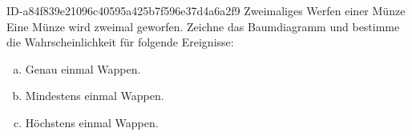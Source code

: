\begin{exercise}
      {ID-a84f839e21096c40595a425b7f596e37d4a6a2f9}
      {Zweimaliges Werfen einer Münze}
  \ifproblem\problem
    Eine Münze wird zweimal geworfen. Zeichne das Baumdiagramm und bestimme
    die Wahrscheinlichkeit für folgende Ereignisse:
    \begin{enumerate}[a)]
      \item Genau einmal Wappen.
      \item Mindestens einmal Wappen.
      \item Höchstens einmal Wappen.
    \end{enumerate}
  \fi
\end{exercise}
